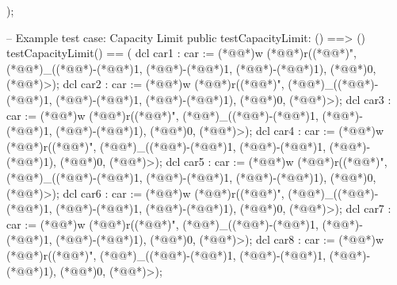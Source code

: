 \documentclass[a4paper]{article}
\begin{document}
\begin{vdm_al}
    );

    -- Example test case: Capacity Limit
    public testCapacityLimit: () ==> ()
    testCapacityLimit() ==
    (
        dcl car1 : car := (*@@*)w (*@@*)r((*@@*)", (*@@*)_((*@\vdmnotcovered{}@*)-(*@\vdmnotcovered{}@*)1, (*@\vdmnotcovered{}@*)-(*@\vdmnotcovered{}@*)1, (*@\vdmnotcovered{}@*)-(*@\vdmnotcovered{}@*)1), (*@\vdmnotcovered{}@*)0, (*@@*)>);
        dcl car2 : car := (*@@*)w (*@@*)r((*@@*)", (*@@*)_((*@\vdmnotcovered{}@*)-(*@\vdmnotcovered{}@*)1, (*@\vdmnotcovered{}@*)-(*@\vdmnotcovered{}@*)1, (*@\vdmnotcovered{}@*)-(*@\vdmnotcovered{}@*)1), (*@\vdmnotcovered{}@*)0, (*@@*)>);
        dcl car3 : car := (*@@*)w (*@@*)r((*@@*)", (*@@*)_((*@\vdmnotcovered{}@*)-(*@\vdmnotcovered{}@*)1, (*@\vdmnotcovered{}@*)-(*@\vdmnotcovered{}@*)1, (*@\vdmnotcovered{}@*)-(*@\vdmnotcovered{}@*)1), (*@\vdmnotcovered{}@*)0, (*@@*)>);
        dcl car4 : car := (*@@*)w (*@@*)r((*@@*)", (*@@*)_((*@\vdmnotcovered{}@*)-(*@\vdmnotcovered{}@*)1, (*@\vdmnotcovered{}@*)-(*@\vdmnotcovered{}@*)1, (*@\vdmnotcovered{}@*)-(*@\vdmnotcovered{}@*)1), (*@\vdmnotcovered{}@*)0, (*@@*)>);
        dcl car5 : car := (*@@*)w (*@@*)r((*@@*)", (*@@*)_((*@\vdmnotcovered{}@*)-(*@\vdmnotcovered{}@*)1, (*@\vdmnotcovered{}@*)-(*@\vdmnotcovered{}@*)1, (*@\vdmnotcovered{}@*)-(*@\vdmnotcovered{}@*)1), (*@\vdmnotcovered{}@*)0, (*@@*)>);
        dcl car6 : car := (*@@*)w (*@@*)r((*@@*)", (*@@*)_((*@\vdmnotcovered{}@*)-(*@\vdmnotcovered{}@*)1, (*@\vdmnotcovered{}@*)-(*@\vdmnotcovered{}@*)1, (*@\vdmnotcovered{}@*)-(*@\vdmnotcovered{}@*)1), (*@\vdmnotcovered{}@*)0, (*@@*)>);
        dcl car7 : car := (*@@*)w (*@@*)r((*@@*)", (*@@*)_((*@\vdmnotcovered{}@*)-(*@\vdmnotcovered{}@*)1, (*@\vdmnotcovered{}@*)-(*@\vdmnotcovered{}@*)1, (*@\vdmnotcovered{}@*)-(*@\vdmnotcovered{}@*)1), (*@\vdmnotcovered{}@*)0, (*@@*)>);
        dcl car8 : car := (*@@*)w (*@@*)r((*@@*)", (*@@*)_((*@\vdmnotcovered{}@*)-(*@\vdmnotcovered{}@*)1, (*@\vdmnotcovered{}@*)-(*@\vdmnotcovered{}@*)1, (*@\vdmnotcovered{}@*)-(*@\vdmnotcovered{}@*)1), (*@\vdmnotcovered{}@*)0, (*@@*)>);
        


\end{vdm_al}
\end{document}
